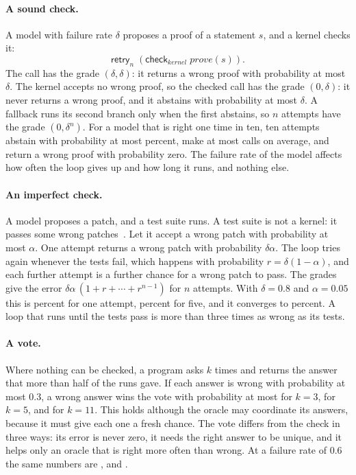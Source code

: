 \documentclass[acmsmall,nonacm,screen]{acmart}
\newcommand{\kw}[1]{\mathsf{#1}}
\newcommand{\chk}[2]{\kw{check}_{#1}\;#2}
\newcommand{\retry}[2]{\kw{retry}_{#1}\;#2}
\newcommand{\nm}[1]{\mathit{#1}}
\begin{document}
\paragraph{A sound check.} A model with failure rate $\delta$ proposes a proof of a statement
$s$, and a kernel checks it:
\[
\retry{n}{(\chk{\nm{kernel}}{\nm{prove}(s)})} .
\]
The call has the grade $(\delta, \delta)$: it returns a wrong proof with probability at most
$\delta$. The kernel accepts no wrong proof, so the checked call has the grade $(0, \delta)$:
it never returns a wrong proof, and it abstains with probability at most $\delta$. A fallback
runs its second branch only when the first abstains, so $n$ attempts have the grade
$(0, \delta^n)$. For a model that is right one time in ten, ten attempts abstain with
probability at most \exLoopTen{} percent, make at most \exLoopCalls{} calls on average, and
return a wrong proof with probability zero. The failure rate of the model affects how often the loop gives
up and how long it runs, and nothing else.

\paragraph{An imperfect check.} A model proposes a patch, and a test suite runs. A test suite
is not a kernel: it passes some wrong patches~\citep{smith2015}. Let it accept a wrong patch
with probability at most $\alpha$. One attempt returns a wrong patch with probability
$\delta\alpha$. The loop tries again whenever the tests fail, which happens with probability
$r = \delta(1 - \alpha)$, and each further attempt is a further chance for a wrong patch to
pass. The grades give the error $\delta\alpha\,(1 + r + \cdots + r^{n-1})$ for $n$ attempts.
With $\delta = 0.8$ and $\alpha = 0.05$ this is \exPatchOne{} percent for one attempt,
\exPatchFive{} percent for five, and it converges to \exPatchLimit{} percent. A loop that runs
until the tests pass is more than three times as wrong as its tests.

\paragraph{A vote.} Where nothing can be checked, a program asks $k$ times and returns the
answer that more than half of the runs gave. If each answer is wrong with probability at most
$0.3$, a wrong answer wins the vote with probability at most \exVoteThree{} for $k = 3$,
\exVoteFive{} for $k = 5$, and \exVoteEleven{} for $k = 11$. This holds although the oracle
may coordinate its answers, because it must give each one a fresh chance. The vote differs
from the check in three ways: its error is never zero, it needs the right answer to be unique,
and it helps only an oracle that is right more often than wrong. At a failure rate of $0.6$
the same numbers are \exVoteBadThree, \exVoteBadFive{} and \exVoteBadEleven.
\end{document}
